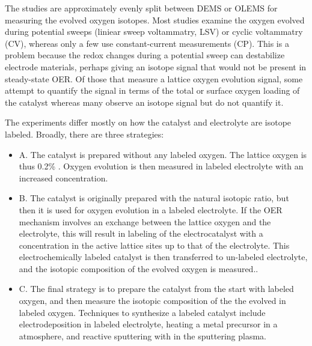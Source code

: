 The studies are approximately evenly split between DEMS or OLEMS for measuring the evolved oxygen isotopes. Most studies examine the oxygen evolved during potential sweeps (liniear sweep voltammatry, LSV) or cyclic voltammatry (CV), whereas only a few use constant-current measurements (CP). This is a problem because the redox changes during a potential sweep can destabilize electrode materials\cite{Kasian2016, Cherevko2016}, perhaps giving an isotope signal that would not be present in steady-state OER. Of those that measure a lattice oxygen evolution signal, some attempt to quantify the signal in terms of the total or surface oxygen loading of the catalyst\cite{Fierro2007, Surendranath2010, Diaz-Morales2013, Amin2017} whereas many observe an isotope signal but do not quantify it\cite{Wohlfahrt-Mehrens1987, Grimaud2017, Geiger2018}. 

The experiments differ mostly on how the catalyst and electrolyte are isotope labeled. Broadly, there are three strategies:


\begin{itemize}
	\item A. The catalyst is prepared without any labeled oxygen. The lattice oxygen is thus 0.2\% . Oxygen evolution is then measured in labeled electrolyte with an increased  concentration\cite{Wohlfahrt-Mehrens1987, Fierro2007, Macounova2009, Amin2017, Roy2018a}.
	
	\item B. The catalyst is originally prepared with the natural isotopic ratio, but then it is used for oxygen evolution in a labeled electrolyte. If the OER mechanism involves an exchange between the lattice oxygen and the electrolyte, this will result in labeling of the electrocatalyst with a  concentration in the active lattice sites up to that of the electrolyte. This electrochemically labeled catalyst is then transferred to un-labeled electrolyte, and the isotopic composition of the evolved oxygen is measured.\cite{Willsau1985, Diaz-Morales2013, Stoerzinger2017a, Amin2017, Grimaud2017, Roy2018a}.
	
	\item C. The final strategy is to prepare the catalyst from the start with labeled oxygen, and then measure the isotopic composition of the the  evolved in labeled oxygen. Techniques to synthesize a labeled catalyst include electrodeposition in labeled electrolyte\cite{Surendranath2010}, heating a metal precursor in a  atmosphere\cite{Roy2018a}, and reactive sputtering with  in the sputtering plasma\cite{Geiger2018}.
\end{itemize}

